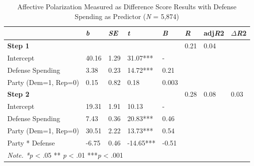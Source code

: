 \documentclass[authordate, meta]{jote-new-article}
\begin{document}
\begin{center}
\begin{minipage}{\textwidth}
\begin{fullwidth}
		\end{fullwidth}
	\end{minipage}
        
        \vspace*{\fill}
    \end{center}




\clearpage

	
		
	\begin{table}[H]
		\begin{fullwidth}
    \centering
	\caption{Affective Polarization Measured as Difference Score Results with Defense Spending as Predictor (\emph{N} = 5,874)}
    \begin{tabular}{l l l l l l l l}
        \hline 
        & \emph{b} & \emph{SE} & \emph{t} & \emph{B} & \emph{R} & adj\emph{R}2 & $\Delta$\emph{R}2 \\ \hline

        \textbf{Step 1} & & & & & 0.21 & 0.04 & \\ 
        Intercept & 40.16 & 1.29 & 31.07*** & - & & & \\
        Defense Spending & 3.38 & 0.23 & 14.72*** & 0.21 & & & \\
        Party (Dem=1, Rep=0) & 0.15 & 0.82 & 0.18 & 0.003 & & & \\ \hline

        \textbf{Step 2} & & & & & 0.28 & 0.08 & 0.03 \\
        Intercept & 19.31 & 1.91 & 10.13 & - & & & \\
        Defense Spending & 7.43 & 0.36 & 20.83*** & 0.46 & & & \\
        Party (Dem=1, Rep=0) & 30.51 & 2.22 & 13.73*** & 0.54 & & & \\
        Party * Defense & -6.75 & 0.46 & -14.65*** & -0.51 & & & \\ \hline
		\multicolumn{8}{l}{\emph{Note. *p }< .05 ** \emph{p }< .01 ***\emph{p} < .001}
    \end{tabular}
	\end{fullwidth}
\end{table}
\end{document}
